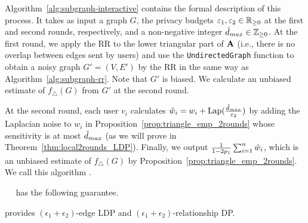 Algorithm~\ref{alg:subgraph-interactive} contains the formal
description of this process. 
It takes as input a graph $G$, 
the privacy budgets $\varepsilon_1, \varepsilon_2 \in \mathbb{R}_{\ge0}$ at the first and second rounds, respectively, 
and 
a non-negative integer $\tilde{d}_{max} \in \mathbb{Z}_{\ge0}$. 
At the first round, we 
apply the RR to the lower triangular part of $\mathbf{A}$ 
(i.e., there is no overlap between edges sent by users) 
and use the \texttt{UndirectedGraph} function to 
obtain a noisy graph $G'=(V,E')$ by the RR in the same way as Algorithm~\ref{alg:subgraph-rr}. 
Note that $G'$ is biased. 
We calculate an unbiased estimate of $f_\triangle(G)$ from $G'$ at the second round.  

At the second round, each user $v_i$ 
calculates $\hat{w}_i = w_i + \textrm{Lap}(\frac{\tilde{d}_{max}}{\varepsilon_2})$ 
by adding the Laplacian noise to $w_i$ 
in Proposition~\ref{prop:triangle_emp_2rounds} 
whose 
sensitivity is at most 
$\tilde{d}_{max}$ 
(as we will prove in Theorem~\ref{thm:local2rounds_LDP}). 
Finally, we output $\frac{1}{1-2p_1}\sum_{i=1}^n \hat{w}_i$, which is an unbiased estimate of $f_\triangle(G)$ by Proposition~\ref{prop:triangle_emp_2rounds}. 
We call this algorithm .


\smallskip
{}~~ 
has the following 
guarantee.

\begin{theorem}\label{thm:local2rounds_LDP}
  provides $(\epsilon_1 + \epsilon_2)$-edge LDP and $(\epsilon_1 + \epsilon_2)$-relationship DP.
\end{theorem}

